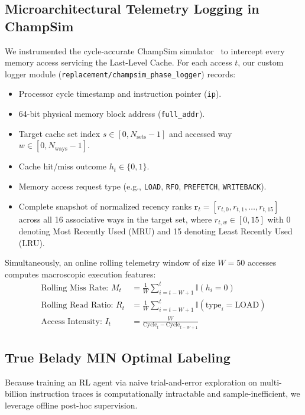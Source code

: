 \documentclass[conference]{IEEEtran}
\begin{document}
\subsection{Microarchitectural Telemetry Logging in ChampSim}
We instrumented the cycle-accurate ChampSim simulator~\cite{champsim} to intercept every memory access servicing the Last-Level Cache. For each access $t$, our custom logger module (\texttt{replacement/champsim\_phase\_logger}) records:
\begin{itemize}
    \item Processor cycle timestamp and instruction pointer (\texttt{ip}).
    \item 64-bit physical memory block address (\texttt{full\_addr}).
    \item Target cache set index $s \in [0, N_{\text{sets}}-1]$ and accessed way $w \in [0, N_{\text{ways}}-1]$.
    \item Cache hit/miss outcome $h_t \in \{0, 1\}$.
    \item Memory access request type (e.g., \texttt{LOAD}, \texttt{RFO}, \texttt{PREFETCH}, \texttt{WRITEBACK}).
    \item Complete snapshot of normalized recency ranks $\mathbf{r}_t = [r_{t,0}, r_{t,1}, \dots, r_{t,15}]$ across all 16 associative ways in the target set, where $r_{t,w} \in [0, 15]$ with 0 denoting Most Recently Used (MRU) and 15 denoting Least Recently Used (LRU).
\end{itemize}

Simultaneously, an online rolling telemetry window of size $W=50$ accesses computes macroscopic execution features:
\begin{align}
    \text{Rolling Miss Rate: } M_t &= \frac{1}{W} \sum_{i=t-W+1}^{t} \mathbb{I}(h_i = 0) \label{eq:miss_rate} \\
    \text{Rolling Read Ratio: } R_t &= \frac{1}{W} \sum_{i=t-W+1}^{t} \mathbb{I}(\text{type}_i = \text{LOAD}) \label{eq:read_ratio} \\
    \text{Access Intensity: } I_t &= \frac{W}{\text{Cycle}_t - \text{Cycle}_{t-W+1}} \label{eq:intensity}
\end{align}

\subsection{True Belady MIN Optimal Labeling}
Because training an RL agent via naive trial-and-error exploration on multi-billion instruction traces is computationally intractable and sample-inefficient, we leverage offline post-hoc supervision. 
\end{document}
